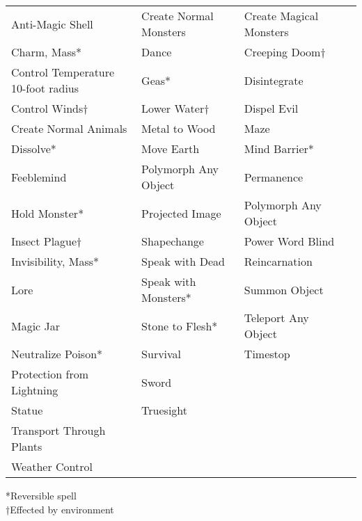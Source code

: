 \begin {table}[H]
\begin{tabularx}{\columnwidth}{YYYY}
	Anti-Magic Shell & Create Normal Monsters & Create Magical Monsters\\
	Charm, Mass* & Dance & Creeping Doom†\\
	Control Temperature 10-foot radius & Geas* & Disintegrate\\
	Control Winds† & Lower Water† & Dispel Evil\\
	Create Normal Animals & Metal to Wood & Maze\\
	Dissolve* & Move Earth & Mind Barrier*\\
	Feeblemind & Polymorph Any Object & Permanence\\
	Hold Monster* & Projected Image & Polymorph Any Object\\
	Insect Plague† & Shapechange & Power Word Blind\\
	Invisibility, Mass* & Speak with Dead & Reincarnation\\
	Lore & Speak with Monsters* & Summon Object\\
	Magic Jar & Stone to Flesh* & Teleport Any Object\\
	Neutralize Poison* & Survival & Timestop\\
	Protection from Lightning & Sword &\\
	Statue & Truesight &\\
	Transport Through Plants &  &\\
	Weather Control &  &\
	\end {tabularx}
	*Reversible spell\\
	†Effected by environment
\end {table}

